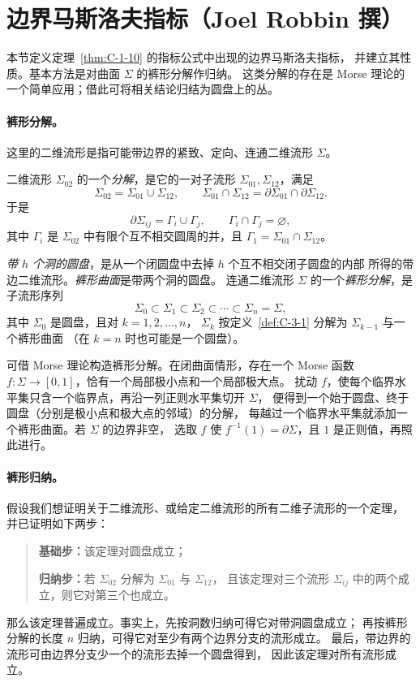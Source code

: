 
\section{边界马斯洛夫指标（Joel Robbin 撰）}\label{sec:C-3}

本节定义定理~\ref{thm:C-1-10} 的指标公式中出现的边界马斯洛夫指标，
并建立其性质。基本方法是对曲面 $\Sigma$ 的裤形分解作归纳。
这类分解的存在是 Morse 理论的一个简单应用；借此可将相关结论归结为圆盘上的丛。

\paragraph{裤形分解。}
这里的二维流形是指可能带边界的紧致、定向、连通二维流形 $\Sigma$。

\begin{definition}\label{def:C-3-1}
二维流形 $\Sigma_{02}$ 的一个\emph{分解}，是它的一对子流形 $\Sigma_{01},\Sigma_{12}$，满足
\[
  \Sigma_{02}=\Sigma_{01}\cup\Sigma_{12},\qquad
  \Sigma_{01}\cap\Sigma_{12}=\partial\Sigma_{01}\cap\partial\Sigma_{12}.
\]
于是
\[
  \partial\Sigma_{ij}=\Gamma_i\cup\Gamma_j,\qquad
  \Gamma_i\cap\Gamma_j=\varnothing,
\]
其中 $\Gamma_i$ 是 $\Sigma_{02}$ 中有限个互不相交圆周的并，且
$\Gamma_1=\Sigma_{01}\cap\Sigma_{12}$。
\end{definition}

\begin{definition}\label{def:C-3-2}
\emph{带 $h$ 个洞的圆盘}，是从一个闭圆盘中去掉 $h$ 个互不相交闭子圆盘的内部
所得的带边二维流形。\emph{裤形曲面}是带两个洞的圆盘。
连通二维流形 $\Sigma$ 的一个\emph{裤形分解}，是子流形序列
\[
  \Sigma_0\subset\Sigma_1\subset\Sigma_2\subset\cdots\subset\Sigma_n=\Sigma,
\]
其中 $\Sigma_0$ 是圆盘，且对 $k=1,2,\ldots,n$，
$\Sigma_k$ 按定义~\ref{def:C-3-1} 分解为 $\Sigma_{k-1}$ 与一个裤形曲面
（在 $k=n$ 时也可能是一个圆盘）。
\end{definition}

可借 Morse 理论构造裤形分解。在闭曲面情形，存在一个 Morse 函数
$f:\Sigma\to[0,1]$，恰有一个局部极小点和一个局部极大点。
扰动 $f$，使每个临界水平集只含一个临界点，再沿一列正则水平集切开 $\Sigma$，
便得到一个始于圆盘、终于圆盘（分别是极小点和极大点的邻域）的分解，
每越过一个临界水平集就添加一个裤形曲面。若 $\Sigma$ 的边界非空，
选取 $f$ 使 $f^{-1}(1)=\partial\Sigma$，且 $1$ 是正则值，再照此进行。

\paragraph{裤形归纳。}
假设我们想证明关于二维流形、或给定二维流形的所有二维子流形的一个定理，
并已证明如下两步：
\begin{quote}
\textbf{基础步：}该定理对圆盘成立；

\textbf{归纳步：}若 $\Sigma_{02}$ 分解为 $\Sigma_{01}$ 与 $\Sigma_{12}$，
且该定理对三个流形 $\Sigma_{ij}$ 中的两个成立，则它对第三个也成立。
\end{quote}
那么该定理普遍成立。事实上，先按洞数归纳可得它对带洞圆盘成立；
再按裤形分解的长度 $n$ 归纳，可得它对至少有两个边界分支的流形成立。
最后，带边界的流形可由边界分支少一个的流形去掉一个圆盘得到，
因此该定理对所有流形成立。

